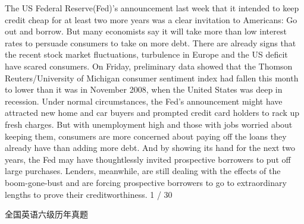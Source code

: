 \documentclass[UTF8,11pt]{ctexart}
\begin{document}
The US Federal Reserve(Fed)'s announcement last week that it intended to keep credit cheap for at least two more years was a clear invitation to Americans: Go out and borrow. But many economists say it will take more than low interest rates to persuade consumers to take on more debt. There are already signs that the recent stock market fluctuations, turbulence in Europe and the US deficit have scared consumers. On Friday, preliminary data showed that the Thomson Reuters/University of Michigan consumer sentiment index had fallen this month to lower than it was in November 2008, when the United States was deep in recession. Under normal circumstances, the Fed's announcement might have attracted new home and car buyers and prompted credit card holders to rack up fresh charges. But with unemployment high and those with jobs worried about keeping them, consumers are more concerned about paying off the loans they already have than adding more debt. And by showing its hand for the next two years, the Fed may have thoughtlessly invited prospective borrowers to put off large purchases. Lenders, meanwhile, are still dealing with the effects of the boom-gone-bust and are forcing prospective borrowers to go to extraordinary lengths to prove their creditworthiness. 1 / 30


全国英语六级历年真题
\end{document}
